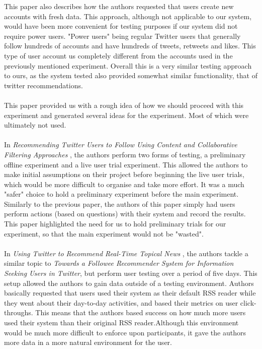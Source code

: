 \documentclass{article}
\begin{document}
This paper also describes how the authors requested that users create new accounts with fresh data. This approach, although not applicable to our system, would have been more convenient for testing purposes if our system did not require power users. "Power users" being regular Twitter users that generally follow hundreds of accounts and have hundreds of tweets, retweets and likes. This type of user account us completely different from the accounts used in the previously mentioned experiment. Overall this is a very similar testing approach to ours, as the system tested also provided somewhat similar functionality, that of twitter recommendations.
\\\\
This paper provided us with a rough idea of how we should proceed with this experiment and generated several ideas for the experiment. Most of which were ultimately not used.
\\\\
In \textit{Recommending Twitter Users to Follow Using Content and
Collaborative Filtering Approaches} \cite{paper2}, the authors perform two forms of testing, a preliminary offline experiment and a live user trial experiment. This allowed the authors to make initial assumptions on their project before beginning the live user trials, which would be more difficult to organise and take more effort. It was a much "safer" choice to hold a preliminary experiment before the main experiment. Similarly to the previous paper, the authors of this paper simply had users perform actions (based on questions) with their system and record the results. This paper highlighted the need for us to hold preliminary trials for our experiment, so that the main experiment would not be "wasted".
\\\\
In \textit{Using Twitter to Recommend Real-Time Topical News} \cite{paper3}, the authors tackle a similar topic to \textit{Towards a Followee Recommender System for Information Seeking Users in Twitter}, but perform user testing over a period of five days. This setup allowed the authors to gain data outside of a testing environment. Authors basically requested that users used their system as their default RSS reader while they went about their day-to-day activities, and based their metrics on user click-throughs. This means that the authors based success on how much more users used their system than their original RSS reader.Although this environment would be much more difficult to enforce upon participants, it gave the authors more data in a more natural environment for the user. 
\end{document}
